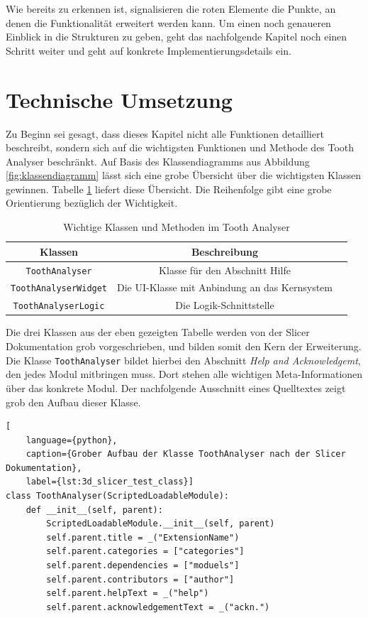 Wie bereits zu erkennen ist, signalisieren die roten Elemente die Punkte, an
denen die Funktionalität erweitert werden kann. Um einen noch genaueren Einblick
in die Strukturen zu geben, geht das nachfolgende Kapitel noch einen Schritt
weiter und geht auf konkrete Implementierungsdetails ein.

\pagebreak

\section{Technische Umsetzung}
\label{sec:technische_umsetzung} Zu Beginn sei gesagt, dass dieses Kapitel nicht
alle Funktionen detailliert beschreibt, sondern sich auf die wichtigsten Funktionen
und Methode des Tooth Analyser beschränkt. Auf Basis des Klassendiagramms aus
Abbildung \ref{fig:klassendiagramm} lässt sich eine grobe Übersicht über die
wichtigsten Klassen gewinnen. Tabelle \ref{tab:methoden_klassen} liefert diese Übersicht.
Die Reihenfolge gibt eine grobe Orientierung bezüglich der Wichtigkeit.

\begin{table}[h]
	\centering
	\begin{tabular}{|c|c|c|}
		\hline
		\textbf{Klassen}             & \textbf{Beschreibung}                              \\
		\hline
		\texttt{ToothAnalyser}       & Klasse für den Abschnitt Hilfe                     \\
		\hline
		\texttt{ToothAnalyserWidget} & Die \ac{UI}-Klasse mit Anbindung an das Kernsystem \\
		\hline
		\texttt{ToothAnalyserLogic}  & Die Logik-Schnittstelle                            \\
		\hline
	\end{tabular}
	\caption{Wichtige Klassen und Methoden im Tooth Analyser}
	\label{tab:methoden_klassen}
\end{table}

Die drei Klassen aus der eben gezeigten Tabelle werden von der Slicer Dokumentation
grob vorgeschrieben, und bilden somit den Kern der Erweiterung. Die Klasse \texttt{ToothAnalyser}
bildet hierbei den Abschnitt \textit{Help and Acknowledgemt}, den jedes Modul
mitbringen muss. Dort stehen alle wichtigen Meta-Informationen über das konkrete
Modul. Der nachfolgende Ausschnitt eines Quelltextes zeigt grob den Aufbau
dieser Klasse.

\begin{lstlisting}[
    language={python},
    caption={Grober Aufbau der Klasse ToothAnalyser nach der Slicer Dokumentation},
    label={lst:3d_slicer_test_class}]
class ToothAnalyser(ScriptedLoadableModule):
    def __init__(self, parent):
	    ScriptedLoadableModule.__init__(self, parent)
	    self.parent.title = _("ExtensionName")
	    self.parent.categories = ["categories"]
	    self.parent.dependencies = ["moduels"]
	    self.parent.contributors = ["author"]
	    self.parent.helpText = _("help")
	    self.parent.acknowledgementText = _("ackn.")
\end{lstlisting}

